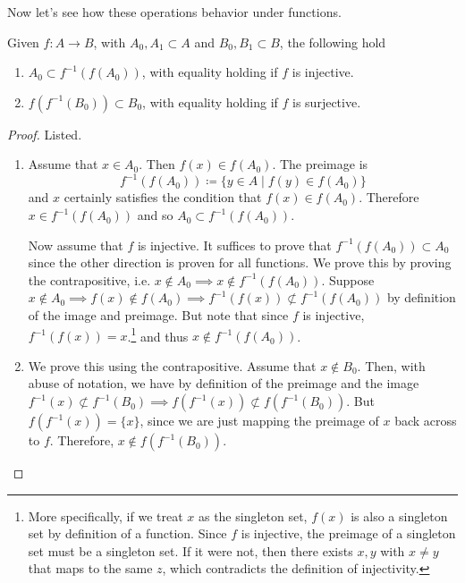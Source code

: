   Now let's see how these operations behavior under functions. 

  \begin{theorem}
    \label{preserve_back_forth}
    Given $f: A \rightarrow B$, with $A_0, A_1 \subset A$ and $B_0, B_1 \subset B$, the following hold 
    \begin{enumerate}
      \item $A_0 \subset f^{-1} (f(A_0))$, with equality holding if $f$ is injective. 
      \item $f(f^{-1}(B_0)) \subset B_0$, with equality holding if $f$ is surjective. 
    \end{enumerate}
  \end{theorem} 
  \begin{proof} 
    Listed. 
    \begin{enumerate}
      \item Assume that $x \in A_0$. Then $f(x) \in f(A_0)$. The preimage is 
      \begin{equation}
        f^{-1} (f(A_0)) \coloneqq \{ y \in A \mid f(y) \in f(A_0) \}
      \end{equation}
      and $x$ certainly satisfies the condition that $f(x) \in f(A_0)$. Therefore $x \in f^{-1} (f(A_0))$ and so $A_0 \subset f^{-1} (f(A_0))$. 

      Now assume that $f$ is injective. It suffices to prove that $f^{-1} (f(A_0)) \subset A_0$ since the other direction is proven for all functions. We prove this by proving the contrapositive, i.e. $x \not\in A_0 \implies x \not\in f^{-1} (f(A_0))$. Suppose $x \not\in A_0 \implies f(x) \not\in f(A_0) \implies f^{-1} (f(x)) \not\subset f^{-1} (f(A_0))$ by definition of the image and preimage. But note that since $f$ is injective, $f^{-1} (f(x)) = x$.\footnote{More specifically, if we treat $x$ as the singleton set, $f(x)$ is also a singleton set by definition of a function. Since $f$ is injective, the preimage of a singleton set must be a singleton set. If it were not, then there exists $x, y$ with $x \neq y$ that maps to the same $z$, which contradicts the definition of injectivity.} and thus $x \not\in f^{-1} (f(A_0))$. 

      \item We prove this using the contrapositive. Assume that $x \not\in B_0$. Then, with abuse of notation, we have by definition of the preimage and the image $f^{-1} (x) \not\subset f^{-1} (B_0) \implies f(f^{-1} (x)) \not\subset f(f^{-1}(B_0))$. But $f (f^{-1} (x)) = \{x\}$, since we are just mapping the preimage of $x$ back across to $f$. Therefore, $x \notin f( f^{-1} (B_0))$. 


\end{enumerate}
\end{proof}
